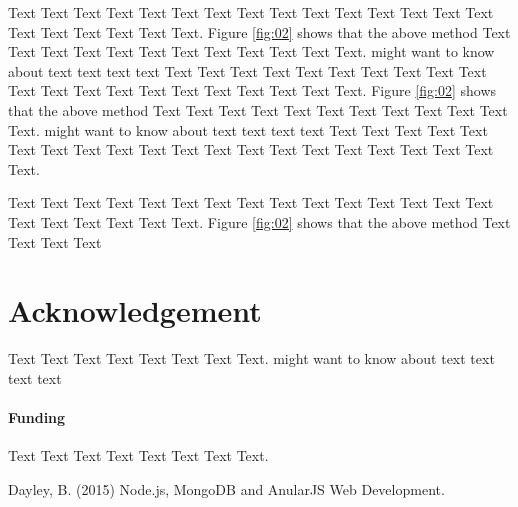 \documentclass{bioinfo}
\begin{document}
Text Text Text Text Text Text  Text Text Text Text Text Text Text Text Text  Text Text Text Text Text Text. Figure \ref{fig:02} shows that the above method  Text Text Text Text  Text Text Text Text Text Text  Text Text.  \citealp{Boffelli03} might want to know about  text text text text
Text Text Text Text Text Text  Text Text Text Text Text Text Text Text Text  Text Text Text Text Text Text. Figure \ref{fig:02} shows that the above method  Text Text Text Text  Text Text Text Text Text Text  Text Text.  \citealp{Boffelli03} might want to know about  text text text text
Text Text Text Text Text Text  Text Text Text Text Text Text Text Text Text  Text Text Text Text Text Text.






Text Text Text Text Text Text  Text Text Text Text Text Text Text Text Text  Text Text Text Text Text Text. Figure \ref{fig:02} shows that the above method  Text Text Text Text


\section*{Acknowledgement}
Text Text Text Text Text Text  Text Text.  \citealp{Boffelli03} might want to know about  text text text text

\paragraph{Funding\textcolon} Text Text Text Text Text Text  Text Text.

%
%
%
%
%
%
%
%
%


\begin{thebibliography}{}
 Dayley, B. (2015) Node.js, MongoDB and AnularJS Web Development.

\end{thebibliography}
\end{document}
